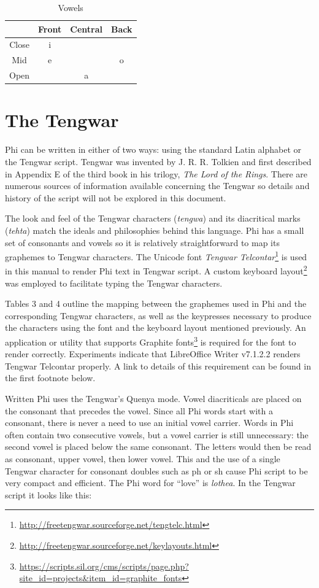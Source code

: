 \documentclass[12pt]{report}
\begin{document}
\noindent
\begin{table}[h]
  \caption{\label{vowels}Vowels}
  \begin{tabular}
    {|c|c|c|c|}
    \hline
    & Front & Central & Back \\
    \hline
    Close & i & & \\
    \hline
    Mid & e & & o \\
    \hline
    Open & & a & \\
    \hline
  \end{tabular}
\end{table}
\clearpage
\section{The Tengwar}
Phi can be written in either of two ways: using the standard Latin alphabet or the Tengwar script. Tengwar was invented by J. R. R. Tolkien and first described in Appendix E of the third book in his trilogy, \emph{The Lord of the Rings}. There are numerous sources of information available concerning the Tengwar so details and history of the script will not be explored in this document.

The look and feel of the Tengwar characters (\emph{tengwa}) and its diacritical marks (\emph{tehta}) match the ideals and philosophies behind this language. Phi has a small set of consonants and vowels so it is relatively straightforward to map its graphemes to Tengwar characters. The Unicode font \emph{Tengwar Telcontar}\footnote{\url{http://freetengwar.sourceforge.net/tengtelc.html}} is used in this manual to render Phi text in Tengwar script. A custom keyboard layout\footnote{\url{http://freetengwar.sourceforge.net/keylayouts.html}} was employed to facilitate typing the Tengwar characters.

Tables 3 and 4 outline the mapping between the graphemes used in Phi and the corresponding Tengwar characters, as well as the keypresses necessary to produce the characters using the font and the keyboard layout mentioned previously. An application or utility that supports Graphite fonts\footnote{\url{https://scripts.sil.org/cms/scripts/page.php?site\_id=projects\&item\_id=graphite\_fonts}} is required for the font to render correctly. Experiments indicate that LibreOffice Writer v7.1.2.2 renders Tengwar Telcontar properly. A link to details of this requirement can be found in the first footnote below.

Written Phi uses the Tengwar’s Quenya mode. Vowel diacriticals are placed on the consonant that precedes the vowel. Since all Phi words start with a consonant, there is never a need to use an initial vowel carrier. Words in Phi often contain two consecutive vowels, but a vowel carrier is still unnecessary: the second vowel is placed below the same consonant. The letters would then be read as consonant, upper vowel, then lower vowel. This and the use of a single Tengwar character for consonant doubles such as ph or sh cause Phi script to be very compact and efficient.
\clearpage
The Phi word for “love” is \emph{lothea}. In the Tengwar script it looks like this:
\end{document}
